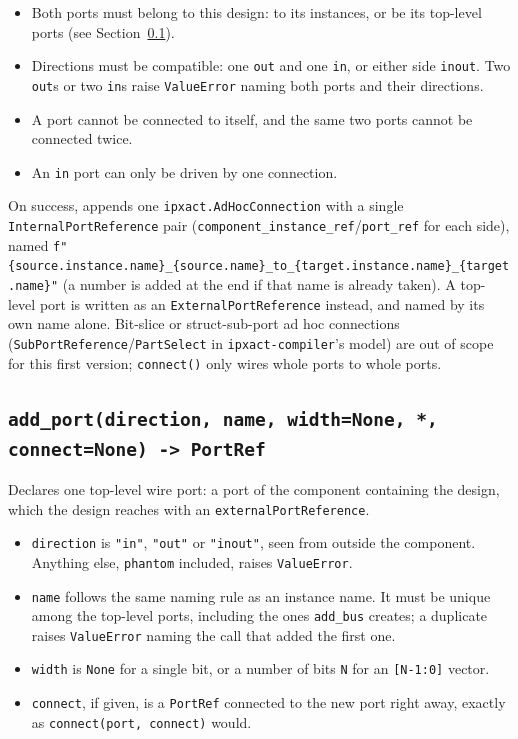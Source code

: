 \documentclass[11pt]{article}
\newcommand{\code}[1]{\texttt{#1}}
\begin{document}
\begin{itemize}
    \item Both ports must belong to this design: to its instances, or be its top-level
    ports (see Section~\ref{sec:add-port}).
    \item Directions must be compatible: one \code{out} and one \code{in}, or either side
    \code{inout}. Two \code{out}s or two \code{in}s raise \code{ValueError} naming both
    ports and their directions.
    \item A port cannot be connected to itself, and the same two ports cannot be
    connected twice.
    \item An \code{in} port can only be driven by one connection.
\end{itemize}

On success, appends one \code{ipxact.AdHocConnection} with a single
\code{InternalPortReference} pair (\code{component\_instance\_ref}/\code{port\_ref} for
each side), named
\code{f"\{source.instance.name\}\_\{source.name\}\_to\_\{target.instance.name\}\_\{target.name\}"}
(a number is added at the end if that name is already taken). A top-level port is
written as an \code{ExternalPortReference} instead, and named by its own name alone.
Bit-slice or struct-sub-port ad hoc connections (\code{SubPortReference}/\code{PartSelect}
in \code{ipxact-compiler}'s model) are out of scope for this first version;
\code{connect()} only wires whole ports to whole ports.

\subsection{\texttt{add\_port(direction, name, width=None, *, connect=None) -> PortRef}}
\label{sec:add-port}

Declares one top-level wire port: a port of the component containing the design, which
the design reaches with an \code{externalPortReference}.

\begin{itemize}
    \item \code{direction} is \code{"in"}, \code{"out"} or \code{"inout"}, seen from
    outside the component. Anything else, \code{phantom} included, raises
    \code{ValueError}.
    \item \code{name} follows the same naming rule as an instance name. It must be unique
    among the top-level ports, including the ones \code{add\_bus} creates; a duplicate
    raises \code{ValueError} naming the call that added the first one.
    \item \code{width} is \code{None} for a single bit, or a number of bits \code{N} for
    an \code{[N-1:0]} vector.
    \item \code{connect}, if given, is a \code{PortRef} connected to the new port right
    away, exactly as \code{connect(port, connect)} would.
\end{itemize}
\end{document}
